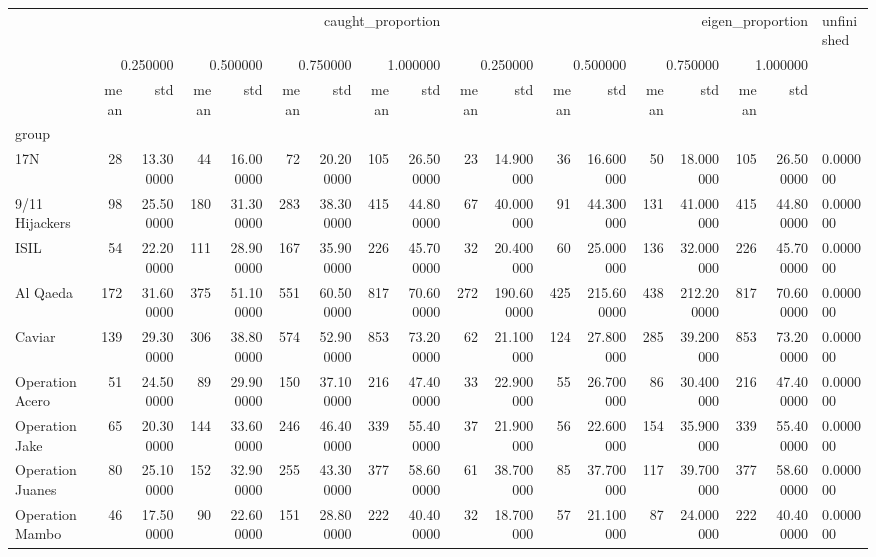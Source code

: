 \begin{tabular}{lrrrrrrrrrrrrrrrrl}
 & \multicolumn{8}{r}{caught_proportion} & \multicolumn{8}{r}{eigen_proportion} & unfinished \\
 & \multicolumn{2}{r}{0.250000} & \multicolumn{2}{r}{0.500000} & \multicolumn{2}{r}{0.750000} & \multicolumn{2}{r}{1.000000} & \multicolumn{2}{r}{0.250000} & \multicolumn{2}{r}{0.500000} & \multicolumn{2}{r}{0.750000} & \multicolumn{2}{r}{1.000000} &  \\
 & mean & std & mean & std & mean & std & mean & std & mean & std & mean & std & mean & std & mean & std &  \\
group &  &  &  &  &  &  &  &  &  &  &  &  &  &  &  &  &  \\
17N & 28 & 13.300000 & 44 & 16.000000 & 72 & 20.200000 & 105 & 26.500000 & 23 & 14.900000 & 36 & 16.600000 & 50 & 18.000000 & 105 & 26.500000 & 0.000000 \\
9/11 Hijackers & 98 & 25.500000 & 180 & 31.300000 & 283 & 38.300000 & 415 & 44.800000 & 67 & 40.000000 & 91 & 44.300000 & 131 & 41.000000 & 415 & 44.800000 & 0.000000 \\
ISIL & 54 & 22.200000 & 111 & 28.900000 & 167 & 35.900000 & 226 & 45.700000 & 32 & 20.400000 & 60 & 25.000000 & 136 & 32.000000 & 226 & 45.700000 & 0.000000 \\
Al Qaeda & 172 & 31.600000 & 375 & 51.100000 & 551 & 60.500000 & 817 & 70.600000 & 272 & 190.600000 & 425 & 215.600000 & 438 & 212.200000 & 817 & 70.600000 & 0.000000 \\
Caviar & 139 & 29.300000 & 306 & 38.800000 & 574 & 52.900000 & 853 & 73.200000 & 62 & 21.100000 & 124 & 27.800000 & 285 & 39.200000 & 853 & 73.200000 & 0.000000 \\
Operation Acero & 51 & 24.500000 & 89 & 29.900000 & 150 & 37.100000 & 216 & 47.400000 & 33 & 22.900000 & 55 & 26.700000 & 86 & 30.400000 & 216 & 47.400000 & 0.000000 \\
Operation Jake & 65 & 20.300000 & 144 & 33.600000 & 246 & 46.400000 & 339 & 55.400000 & 37 & 21.900000 & 56 & 22.600000 & 154 & 35.900000 & 339 & 55.400000 & 0.000000 \\
Operation Juanes & 80 & 25.100000 & 152 & 32.900000 & 255 & 43.300000 & 377 & 58.600000 & 61 & 38.700000 & 85 & 37.700000 & 117 & 39.700000 & 377 & 58.600000 & 0.000000 \\
Operation Mambo & 46 & 17.500000 & 90 & 22.600000 & 151 & 28.800000 & 222 & 40.400000 & 32 & 18.700000 & 57 & 21.100000 & 87 & 24.000000 & 222 & 40.400000 & 0.000000 \\

\end{tabular}
